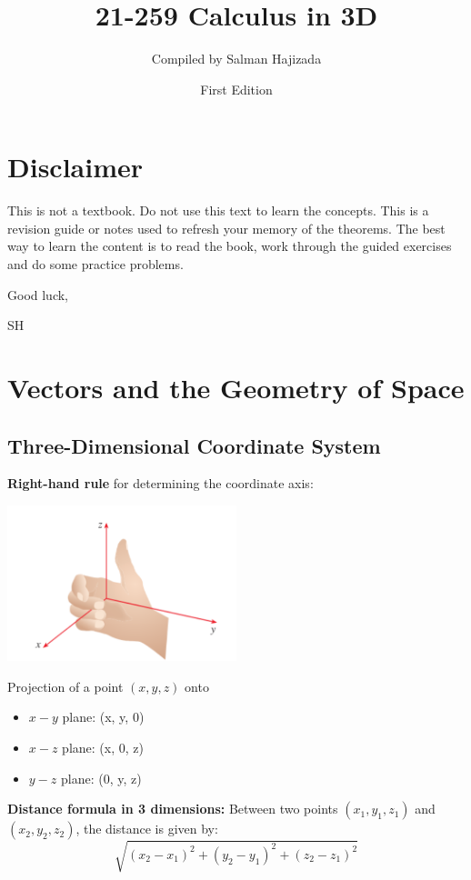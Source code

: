 \documentclass{report}
\title{21-259 Calculus in 3D}
\date{First Edition}
\author{Compiled by Salman Hajizada}
\begin{document}
\maketitle

\setcounter{chapter}{-1}
\chapter{Disclaimer}
This is not a textbook. Do not use this text to learn the concepts.
This is a revision guide or notes used to refresh your memory of the theorems. 
The best way to learn the content is to read the book, work through
the guided exercises and do some practice problems. 

Good luck,

SH
\setcounter{chapter}{11}
\chapter{Vectors and the Geometry of Space}

\section{Three-Dimensional Coordinate System}

\textbf{Right-hand rule} for determining the coordinate axis:
\begin{center}
    \includegraphics[width=0.5\textwidth]{images/right_hand_rule.png}
\end{center}

Projection of a point $(x, y, z)$ onto
\begin{itemize}
    \item $x-y$ plane: (x, y, 0)
    \item $x-z$ plane: (x, 0, z)
    \item $y-z$ plane: (0, y, z)
\end{itemize} 

\textbf{Distance formula in 3 dimensions:} Between two points $(x_1, y_1, z_1)$ and 
$(x_2, y_2, z_2)$, the distance is given by:
\[\sqrt{(x_2 - x_1)^2 + (y_2 - y_1)^2 +(z_2 - z_1)^2}\]
\end{document}
